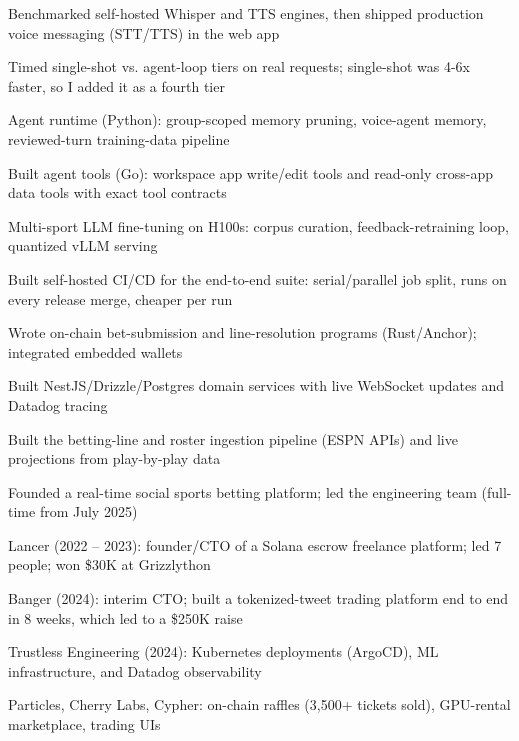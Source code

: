 \documentclass[print]{jack-resume}
\begin{document}
\begin{tightemize}
    \item Benchmarked self-hosted Whisper and TTS engines, then shipped production voice messaging (STT/TTS) in the web app
    \item Timed single-shot vs. agent-loop tiers on real requests; single-shot was 4-6x faster, so I added it as a fourth tier
    \item Agent runtime (Python): group-scoped memory pruning, voice-agent memory, reviewed-turn training-data pipeline
    \item Built agent tools (Go): workspace app write/edit tools and read-only cross-app data tools with exact tool contracts
    \item Multi-sport LLM fine-tuning on H100s: corpus curation, feedback-retraining loop, quantized vLLM serving
    \item Built self-hosted CI/CD for the end-to-end suite: serial/parallel job split, runs on every release merge, cheaper per run
\end{tightemize}
\sectionsep

\begin{tightemize}
    \item Wrote on-chain bet-submission and line-resolution programs (Rust/Anchor); integrated embedded wallets
    \item Built NestJS/Drizzle/Postgres domain services with live WebSocket updates and Datadog tracing
    \item Built the betting-line and roster ingestion pipeline (ESPN APIs) and live projections from play-by-play data
    \item Founded a real-time social sports betting platform; led the engineering team (full-time from July 2025)
\end{tightemize}
\sectionsep

\begin{tightemize}
    \item Lancer (2022 – 2023): founder/CTO of a Solana escrow freelance platform; led 7 people; won \$30K at Grizzlython
    \item Banger (2024): interim CTO; built a tokenized-tweet trading platform end to end in 8 weeks, which led to a \$250K raise
    \item Trustless Engineering (2024): Kubernetes deployments (ArgoCD), ML infrastructure, and Datadog observability
    \item Particles, Cherry Labs, Cypher: on-chain raffles (3,500+ tickets sold), GPU-rental marketplace, trading UIs
\end{tightemize}
\sectionsep
\end{document}
